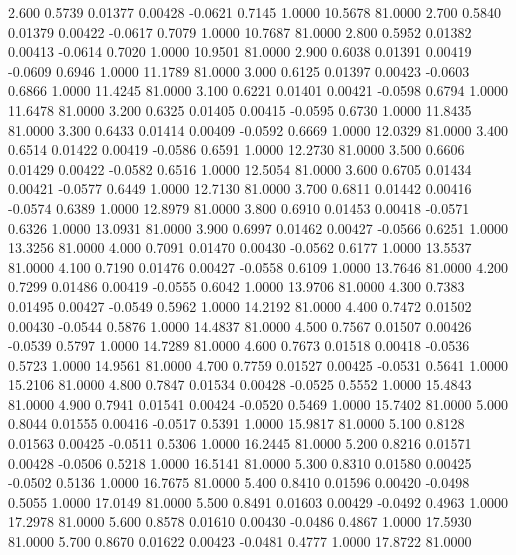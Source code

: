    2.600   0.5739   0.01377   0.00428  -0.0621   0.7145   1.0000  10.5678  81.0000
   2.700   0.5840   0.01379   0.00422  -0.0617   0.7079   1.0000  10.7687  81.0000
   2.800   0.5952   0.01382   0.00413  -0.0614   0.7020   1.0000  10.9501  81.0000
   2.900   0.6038   0.01391   0.00419  -0.0609   0.6946   1.0000  11.1789  81.0000
   3.000   0.6125   0.01397   0.00423  -0.0603   0.6866   1.0000  11.4245  81.0000
   3.100   0.6221   0.01401   0.00421  -0.0598   0.6794   1.0000  11.6478  81.0000
   3.200   0.6325   0.01405   0.00415  -0.0595   0.6730   1.0000  11.8435  81.0000
   3.300   0.6433   0.01414   0.00409  -0.0592   0.6669   1.0000  12.0329  81.0000
   3.400   0.6514   0.01422   0.00419  -0.0586   0.6591   1.0000  12.2730  81.0000
   3.500   0.6606   0.01429   0.00422  -0.0582   0.6516   1.0000  12.5054  81.0000
   3.600   0.6705   0.01434   0.00421  -0.0577   0.6449   1.0000  12.7130  81.0000
   3.700   0.6811   0.01442   0.00416  -0.0574   0.6389   1.0000  12.8979  81.0000
   3.800   0.6910   0.01453   0.00418  -0.0571   0.6326   1.0000  13.0931  81.0000
   3.900   0.6997   0.01462   0.00427  -0.0566   0.6251   1.0000  13.3256  81.0000
   4.000   0.7091   0.01470   0.00430  -0.0562   0.6177   1.0000  13.5537  81.0000
   4.100   0.7190   0.01476   0.00427  -0.0558   0.6109   1.0000  13.7646  81.0000
   4.200   0.7299   0.01486   0.00419  -0.0555   0.6042   1.0000  13.9706  81.0000
   4.300   0.7383   0.01495   0.00427  -0.0549   0.5962   1.0000  14.2192  81.0000
   4.400   0.7472   0.01502   0.00430  -0.0544   0.5876   1.0000  14.4837  81.0000
   4.500   0.7567   0.01507   0.00426  -0.0539   0.5797   1.0000  14.7289  81.0000
   4.600   0.7673   0.01518   0.00418  -0.0536   0.5723   1.0000  14.9561  81.0000
   4.700   0.7759   0.01527   0.00425  -0.0531   0.5641   1.0000  15.2106  81.0000
   4.800   0.7847   0.01534   0.00428  -0.0525   0.5552   1.0000  15.4843  81.0000
   4.900   0.7941   0.01541   0.00424  -0.0520   0.5469   1.0000  15.7402  81.0000
   5.000   0.8044   0.01555   0.00416  -0.0517   0.5391   1.0000  15.9817  81.0000
   5.100   0.8128   0.01563   0.00425  -0.0511   0.5306   1.0000  16.2445  81.0000
   5.200   0.8216   0.01571   0.00428  -0.0506   0.5218   1.0000  16.5141  81.0000
   5.300   0.8310   0.01580   0.00425  -0.0502   0.5136   1.0000  16.7675  81.0000
   5.400   0.8410   0.01596   0.00420  -0.0498   0.5055   1.0000  17.0149  81.0000
   5.500   0.8491   0.01603   0.00429  -0.0492   0.4963   1.0000  17.2978  81.0000
   5.600   0.8578   0.01610   0.00430  -0.0486   0.4867   1.0000  17.5930  81.0000
   5.700   0.8670   0.01622   0.00423  -0.0481   0.4777   1.0000  17.8722  81.0000
